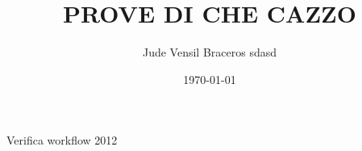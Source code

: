 \documentclass{article}
\title{PROVE DI CHE CAZZO}
\author{Jude Vensil Braceros sdasd}
\date{\today}
\begin{document}
\maketitle

Verifica workflow 2012
\end{document}
